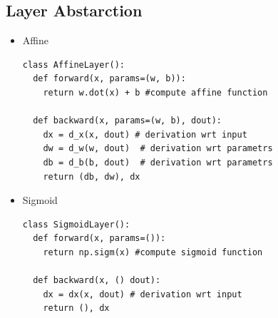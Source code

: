 \documentclass{beamer}
\begin{document}
	\subsection*{Layer Abstarction}
\begin{frame}[fragile]


\begin{itemize}
	\item Affine
	\begin{verbatim}
class AffineLayer(): 
  def forward(x, params=(w, b)):
    return w.dot(x) + b #compute affine function

  def backward(x, params=(w, b), dout):
    dx = d_x(x, dout) # derivation wrt input 
    dw = d_w(w, dout)  # derivation wrt parametrs  
    db = d_b(b, dout)  # derivation wrt parametrs  
    return (db, dw), dx
	\end{verbatim}
	
	\item Sigmoid 
	\begin{verbatim}    
class SigmoidLayer():
  def forward(x, params=()):
    return np.sigm(x) #compute sigmoid function

  def backward(x, () dout):
    dx = dx(x, dout) # derivation wrt input 
    return (), dx
	\end{verbatim}
\end{itemize}

\end{frame}
	
\end{document}
